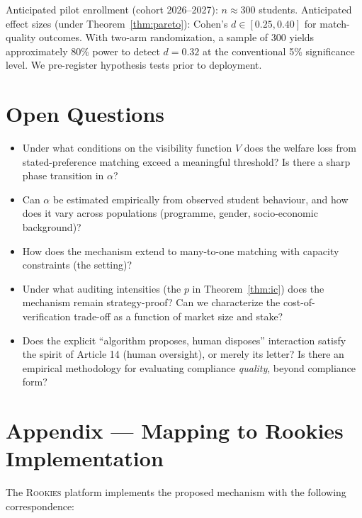 \documentclass[11pt,a4paper]{article}
\begin{document}
Anticipated pilot enrollment (cohort 2026--2027): $n \approx 300$ students. Anticipated effect sizes (under Theorem~\ref{thm:pareto}): Cohen's $d \in [0.25, 0.40]$ for match-quality outcomes. With two-arm randomization, a sample of 300 yields approximately 80\% power to detect $d = 0.32$ at the conventional 5\% significance level. We pre-register hypothesis tests prior to deployment.

\section{Open Questions}
\label{sec:open}

\begin{itemize}[leftmargin=2em,itemsep=2pt,topsep=4pt]
    \item[\textbf{Q1}] Under what conditions on the visibility function $V$ does the welfare loss from stated-preference matching exceed a meaningful threshold? Is there a sharp phase transition in $\alpha$?
    \item[\textbf{Q2}] Can $\alpha$ be estimated empirically from observed student behaviour, and how does it vary across populations (programme, gender, socio-economic background)?
    \item[\textbf{Q3}] How does the mechanism extend to many-to-one matching with capacity constraints (the \citet{hatfieldMilgrom2005} setting)?
    \item[\textbf{Q4}] Under what auditing intensities (the $p$ in Theorem~\ref{thm:ic}) does the mechanism remain strategy-proof? Can we characterize the cost-of-verification trade-off as a function of market size and stake?
    \item[\textbf{Q5}] Does the explicit ``algorithm proposes, human disposes'' interaction satisfy the spirit of Article 14 (human oversight), or merely its letter? Is there an empirical methodology for evaluating compliance \emph{quality}, beyond compliance form?
\end{itemize}

\section*{Appendix --- Mapping to Rookies Implementation}
\label{sec:appendix}

The \textsc{Rookies} platform implements the proposed mechanism with the following correspondence:
\end{document}
